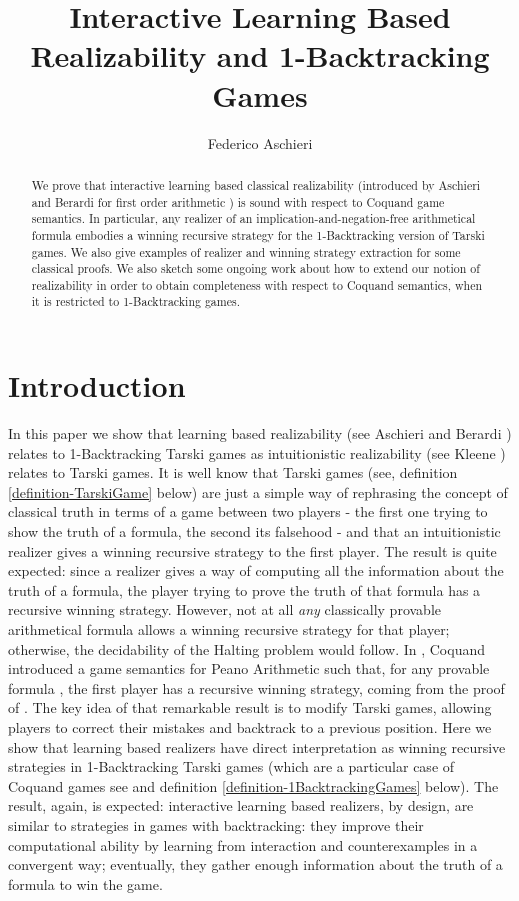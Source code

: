 \documentclass[copyright,creativecommons]{eptcs}
\title{Interactive Learning Based Realizability and 1-Backtracking Games}
\author{Federico Aschieri
\institute{Dipartimento di Informatica\\
Universit\`a di Torino\\ Italy}
\institute{School of Electronic Engineering and Computer Science\\
Queen Mary, University of London\\
UK}
}
\begin{document}
\maketitle

\begin{abstract}  We prove that interactive learning based classical realizability (introduced by Aschieri and Berardi for first order arithmetic \cite{Aschieri}) is sound with respect to Coquand game semantics. In particular, any realizer of an implication-and-negation-free arithmetical formula embodies a winning recursive strategy for the 1-Backtracking version of Tarski games. We also give examples of realizer and winning strategy extraction for some classical proofs. We also sketch some ongoing work about how to extend our notion of realizability in order to obtain completeness with respect to Coquand semantics, when it is restricted to 1-Backtracking games.
 \end{abstract}

\section{Introduction}

In this paper we show that learning based realizability (see Aschieri and Berardi \cite{Aschieri}) relates to 1-Backtracking Tarski games as intuitionistic realizability (see Kleene \cite{Kleene}) relates to Tarski games. It is well know that Tarski games (see, definition \ref{definition-TarskiGame} below) are just a simple way of rephrasing the concept of classical truth in terms of a game between two players - the first one trying to show the truth of a formula, the second its falsehood - and that an intuitionistic realizer gives a winning recursive strategy to the first player. The result is quite expected: since a realizer gives a way of computing all the information about the truth of a formula, the player trying to prove the truth of that formula has a recursive winning strategy. However, not at all \emph{any} classically provable arithmetical formula allows a winning recursive strategy for that player; otherwise, the decidability of the Halting problem would follow. In \cite{Coquand}, Coquand introduced a game semantics for Peano Arithmetic such that, for any provable formula , the first player has a recursive winning strategy, coming from the proof of . The key idea of that remarkable result is to modify Tarski games, allowing players to correct their mistakes and backtrack to a previous position. Here we show that  learning based realizers have direct interpretation as winning recursive strategies in 1-Backtracking Tarski games (which are a particular case of Coquand games see \cite{BerCoq} and definition \ref{definition-1BacktrackingGames} below). The result, again, is expected: interactive learning based realizers, by design, are similar to strategies in games with backtracking: they improve their computational ability by learning from interaction and counterexamples in a convergent way; eventually, they gather enough information about the truth of a formula to win the game. 
\end{document}
